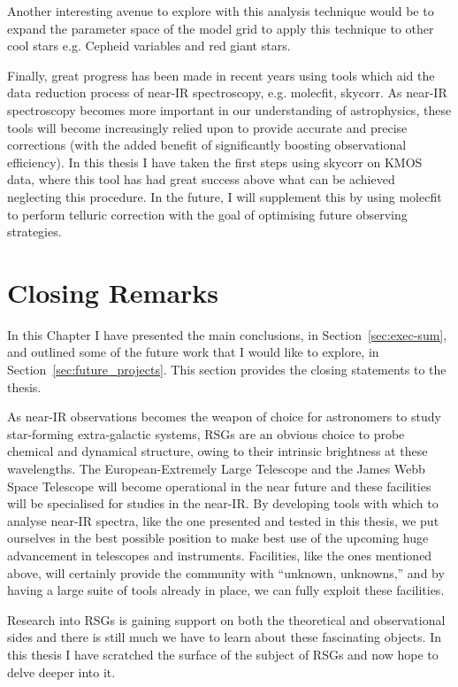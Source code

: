 Another interesting avenue to explore with this analysis technique would be to expand the parameter space of the model grid to apply this technique to other cool stars e.g. Cepheid variables and red giant stars.

Finally, great progress has been made in recent years using tools which aid the data reduction process of near-IR spectroscopy,
e.g. {\sc molecfit, skycorr}.
As near-IR spectroscopy becomes more important in our understanding of astrophysics, these tools will become increasingly relied upon to provide accurate and precise corrections (with the added benefit of significantly boosting observational efficiency).
In this thesis I have taken the first steps using {\sc skycorr} on KMOS data, where this tool has had great success above what can be achieved neglecting this procedure.
In the future, I will supplement this by using {\sc molecfit} to perform telluric correction with the goal of optimising future observing strategies.


\section{Closing Remarks} %
\label{sec:closing_remarks}

In this Chapter I have presented the main conclusions, in Section~\ref{sec:exec-sum}, and outlined some of the future work that I would like to explore, in Section~\ref{sec:future_projects}.
This section provides the closing statements to the thesis.


As near-IR observations becomes the weapon of choice for astronomers to study star-forming extra-galactic systems, RSGs are an obvious choice to probe chemical and dynamical structure, owing to their intrinsic brightness at these wavelengths.
The European-Extremely Large Telescope and the James Webb Space Telescope will become operational in the near future and these facilities will be specialised for studies in the near-IR.
By developing tools with which to analyse near-IR spectra, like the one presented and tested in this thesis, we put ourselves in the best possible position to make best use of the upcoming huge advancement in telescopes and instruments.
Facilities, like the ones mentioned above, will certainly provide the community with ``unknown, unknowns,'' and by having a large suite of tools already in place, we can fully exploit these facilities.

Research into RSGs is gaining support on both the theoretical and observational sides and there is still much we have to learn about these fascinating objects.
In this thesis I have scratched the surface of the subject of RSGs and now hope to delve deeper into it.


% 
